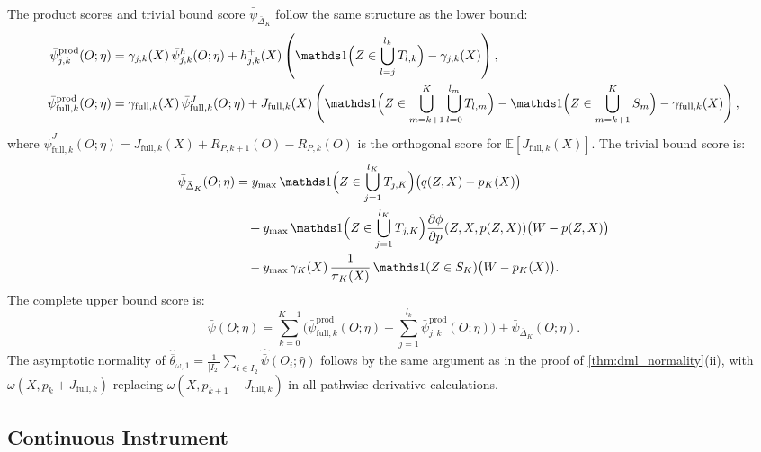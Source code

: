 The product scores and trivial bound score $\bar{\psi}_{\bar{\Delta}_K}$ follow the same structure as the lower bound:
\begin{align*}
    \bar{\psi}_{j,k}^{\mathrm{prod}}(O;\eta) &= \gamma_{j,k}(X)\,\bar{\psi}_{j,k}^h(O;\eta) + h_{j,k}^+(X)\left(\indicator\Big(Z \in \bigcup_{l=j}^{l_k}T_{l,k}\Big) - \gamma_{j,k}(X)\right), \\
    \bar{\psi}_{\mathrm{full},k}^{\mathrm{prod}}(O;\eta) &= \gamma_{\mathrm{full},k}(X)\,\bar{\psi}_{\mathrm{full},k}^J(O;\eta) + J_{\mathrm{full},k}(X)\left(\indicator\Big(Z \in \bigcup_{m=k+1}^K\bigcup_{l=0}^{l_m}T_{l,m}\Big) - \indicator\Big(Z \in \bigcup_{m=k+1}^K S_m\Big) - \gamma_{\mathrm{full},k}(X)\right),
\end{align*}
where $\bar{\psi}_{\mathrm{full},k}^J(O;\eta) = J_{\mathrm{full},k}(X) + R_{P,k+1}(O) - R_{P,k}(O)$ is the orthogonal score for $\mathbb{E}[J_{\mathrm{full},k}(X)]$. The trivial bound score is:
\begin{align*}
    \bar{\psi}_{\bar{\Delta}_K}(O;\eta) &= y_{\max}\,\indicator\Big(Z \in \bigcup_{j=1}^{l_K}T_{j,K}\Big)\big(q(Z,X) - p_K(X)\big) \\
    &\quad + y_{\max}\,\indicator\Big(Z \in \bigcup_{j=1}^{l_K}T_{j,K}\Big)\frac{\partial\phi}{\partial p}(Z,X,p(Z,X))\big(W - p(Z,X)\big) \\
    &\quad - y_{\max}\,\gamma_K(X)\,\frac{1}{\pi_K(X)}\,\indicator(Z \in S_K)\big(W - p_K(X)\big).
\end{align*}
The complete upper bound score is:
\begin{equation*}
    \bar{\psi}(O;\eta) = \sum_{k=0}^{K-1}\Big(\bar{\psi}_{\mathrm{full},k}^{\mathrm{prod}}(O;\eta) + \sum_{j=1}^{l_k}\bar{\psi}_{j,k}^{\mathrm{prod}}(O;\eta)\Big) + \bar{\psi}_{\bar{\Delta}_K}(O;\eta).
\end{equation*}
The asymptotic normality of $\hat{\overline{\theta}}_{\omega,1} = \frac{1}{|I_2|}\sum_{i \in I_2}\hat{\bar{\psi}}(O_i;\hat{\eta})$ follows by the same argument as in the proof of \cref{thm:dml_normality}\textup{(ii)}, with $\omega(X,p_k+J_{\mathrm{full},k})$ replacing $\omega(X,p_{k+1}-J_{\mathrm{full},k})$ in all pathwise derivative calculations.
\fi 



\subsection{Continuous Instrument}


